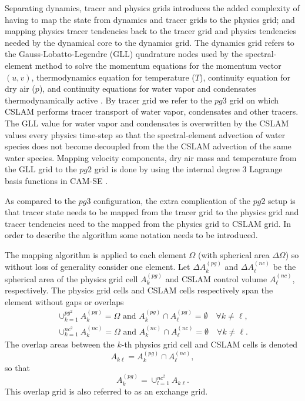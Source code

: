 Separating dynamics, tracer and physics grids introduces the added complexity of having to map the state from dynamics and tracer grids to the physics grid; and mapping physics tracer tendencies back to the tracer grid and physics tendencies needed by the dynamical core to the dynamics grid. The dynamics grid refers to the Gauss-Lobatto-Legendre (GLL) quadrature nodes used by the spectral-element method to solve the momentum equations for the momentum vector $(u,v)$, thermodynamics equation for temperature ($T$), continuity equation for dry air ($p$), and continuity equations for water vapor and condensates thermodynamically active \citep[see, e.g., ][ for details]{LetAl2018JAMES}. By tracer grid we refer to the $pg3$ grid on which CSLAM performs tracer transport of water vapor, condensates and other tracers. The GLL value for water vapor and condensates is overwritten by the CSLAM values every physics time-step so that the spectral-element advection of water species does not become decoupled from the the CSLAM advection of the same water species. Mapping velocity components, dry air mass and temperature from the GLL grid to the $pg2$ grid is done by using the internal degree 3 Lagrange basis functions in CAM-SE \citep[as described in  ][ for pg3; exactly the same methods can be used for $pg2$]{HL2018MWR}.

As compared to the $pg3$ configuration, the extra complication of the $pg2$ setup is that tracer state needs to be mapped from the tracer grid to the physics grid and tracer tendencies need to the mapped from the physics grid to CSLAM grid. In order to describe the algorithm some notation needs to be introduced.

The mapping algorithm is applied to each element $\Omega$ (with spherical area $\Delta \Omega$) so without loss of generality consider one element. Let $\Delta A^{(pg)}_k$ and $\Delta A^{(nc)}_\ell$ be the spherical area of the physics grid cell $A^{(pg)}_k$ and CSLAM control volume $A^{(nc)}_\ell$, respectively. The physics grid cells and CSLAM cells respectively span the element without gaps or overlaps
\begin{eqnarray}
\cup_{k=1}^{pg^2}A^{(pg)}_k=\Omega \text{ and } A^{(pg)}_k \cap A^{(pg)}_\ell = \emptyset \quad \forall k\ne \ell,\\
\cup_{k=1}^{nc^2}A^{(nc)}_k=\Omega \text{ and } A^{(nc)}_k \cap A^{(nc)}_\ell = \emptyset \quad \forall k\ne \ell.
\end{eqnarray}
The overlap areas between the $k$-th physics grid cell and CSLAM cells is denoted
\begin{equation}
A_{k\ell}=A^{(pg)}_k \cap A^{(nc)}_\ell,
\end{equation}
so that
\begin{equation}
A^{(pg)}_k=\cup_{l=1}^{nc^2}A_{k\ell}.
\end{equation}
This overlap grid is also referred to as an exchange grid.
